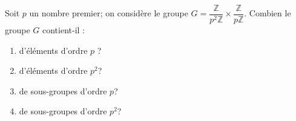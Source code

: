 Soit $p$ un nombre premier; on considère le groupe $G=\dfrac{\mathbb{Z}}{p^2\mathbb{Z}} \times \dfrac{\mathbb{Z}}{p \mathbb{Z}}$. Combien le groupe $G$ contient-il : 

\begin{enumerate}[label=\alph*)]
    \item d'éléments d'ordre $p$ ?
    \item  d'éléments d'ordre $p^2$?
        \item de sous-groupes d'ordre $p$?
    \item  de sous-groupes d'ordre $p^2$?
\end{enumerate}
